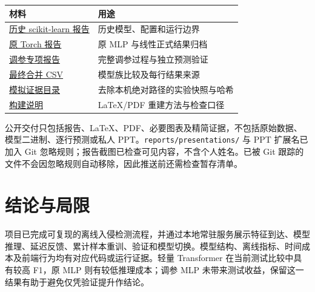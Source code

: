 \documentclass[UTF8,a4paper,11pt,fontset=fandol]{ctexart}
\newcounter{none}
\begin{document}

{\def\LTcaptype{none} %
\begin{longtable}[]{@{}
  >{\raggedright\arraybackslash}p{}
  >{\raggedright\arraybackslash}p{}@{}}
\toprule\noalign{}
\begin{minipage}[b]{\linewidth}\raggedright
材料
\end{minipage} & \begin{minipage}[b]{\linewidth}\raggedright
用途
\end{minipage} \\
\midrule\noalign{}
\endhead
\bottomrule\noalign{}
\endlastfoot
\href{https://github.com/ZureTz/ml-network-intrusion-detection/blob/master/reports/sklearn-20261103.md}{历史
scikit-learn 报告} & 历史模型、配置和运行边界 \\
\href{https://github.com/ZureTz/ml-network-intrusion-detection/blob/master/reports/torch-20261105.md}{原
Torch 报告} & 原 MLP 与线性正式结果归档 \\
\href{https://github.com/ZureTz/ml-network-intrusion-detection/blob/master/reports/transformer-tuning-20261105.md}{调参专项报告}
& 完整调参过程与独立预测验证 \\
\href{https://github.com/ZureTz/ml-network-intrusion-detection/blob/master/reports/final/comparison.csv}{最终合并
CSV} & 模型族比较及每行结果来源 \\
\href{https://github.com/ZureTz/ml-network-intrusion-detection/blob/master/reports/results/simulation-20261106/}{模拟证据目录}
& 去除本机绝对路径的实验快照与哈希 \\
\href{https://github.com/ZureTz/ml-network-intrusion-detection/blob/master/reports/final/README.md}{构建说明}
& LaTeX/PDF 重建方法与检查口径 \\
\end{longtable}
}

公开交付只包括报告、LaTeX、PDF、必要图表及精简证据，不包括原始数据、模型二进制、逐行预测或私人
PPT。\texttt{reports/presentations/} 与 PPT 扩展名已加入 Git
忽略规则；报告截图已检查可见内容，不含个人姓名。已被 Git
跟踪的文件不会因忽略规则自动移除，因此推送前还需检查暂存清单。

\section{结论与局限}\label{ux7ed3ux8bbaux4e0eux5c40ux9650}

项目已完成可复现的离线入侵检测流程，并通过本地常驻服务展示特征到达、模型推理、延迟反馈、累计样本重训、验证和模型切换。模型结构、离线指标、时间成本及前端行为均有对应代码或运行证据。轻量
Transformer 在当前测试比较中具有较高 F1，原 MLP 则有较低推理成本；调参
MLP 未带来测试收益，保留这一结果有助于避免仅凭验证提升作结论。
\end{document}
